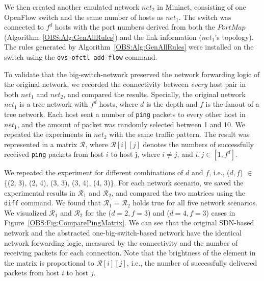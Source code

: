 We then created another emulated network $net_2$ in Mininet, consisting of one OpenFlow switch and the same number of hosts as $net_1$.
The switch was connected to $f^d$ hosts with the port numbers derived from both the $PortMap$ (Algorithm~\ref{OBS:Alg:GenAllRules})
and the link information ($net_1$'s topology).
The rules generated by Algorithm~\ref{OBS:Alg:GenAllRules} were installed on the switch using the \texttt{ovs-ofctl add-flow} command.

To validate that the big-switch-network preserved the network forwarding logic of the original network,
we recorded the connectivity between \emph{every} host pair in both $net_1$ and $net_2$,
and compared the results.
Specially, the original network $net_1$ is a tree network with $f^d$ hosts,
where $d$ is the depth and $f$ is the fanout of a tree network.
Each host sent a number of \texttt{ping} packets to every other host in $net_1$,
and the amount of packet was randomly selected between 1 and 10.
We repeated the experiments in $net_2$ with the same traffic pattern.
The result was represented in a matrix $\mathcal{R}$,
where $\mathcal{R}[i][j]$ denotes the numbers of successfully received \texttt{ping}
packets from host $i$ to host j, where $i \neq j$, and $i, j \in [1, f^d]$.


We repeated the experiment for different combinations of $d$ and $f$, i.e., ($d, f$) $\in$
\{(2, 3), (2, 4), (3, 3), (3, 4), (4, 3)\}. For each network scenario,
we saved the experimental results in $\mathcal{R}_1$ and $\mathcal{R}_2$, and compared the two matrices using the \texttt{diff} command.
We found that $\mathcal{R}_1 = \mathcal{R}_2$ holds true for all five network scenarios.
We visualized $\mathcal{R}_1$ and $\mathcal{R}_2$ for the ($d=2, f=3$) and ($d=4, f=3$) cases
in Figure~\ref{OBS:Fig:ComparePingMatrix}.
We can see that the original SDN-based network and the abstracted one-big-switch-based
network have the identical network forwarding logic,
measured by the connectivity and the number of receiving packets for each connection.
Note that the brightness of the element in the matrix is proportional to $\mathcal{R}[i][j]$,
i.e., the number of successfully delivered packets from host $i$ to host $j$.

